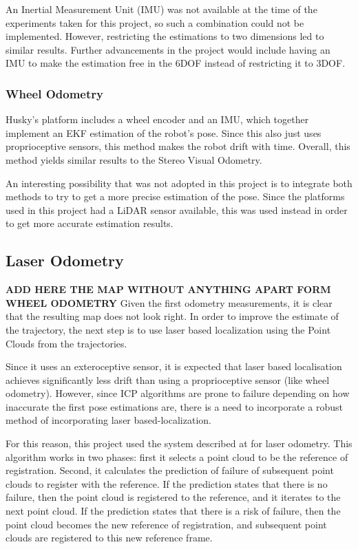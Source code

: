 \documentclass[12pt]{article}
\begin{document}
An Inertial Measurement Unit (IMU) was not available at the time of the experiments taken for this project, so such a combination could not be implemented. However, restricting the estimations to two dimensions led to similar results. Further advancements in the project would include having an IMU to make the estimation free in the 6DOF instead of restricting it to 3DOF.
	
	\subsubsection*{Wheel Odometry}

Husky's platform includes a wheel encoder and an IMU, which together implement an EKF estimation of the robot's pose. Since this also just uses proprioceptive sensors, this method makes the robot drift with time. Overall, this method yields similar results to the Stereo Visual Odometry.

An interesting possibility that was not adopted in this project is to integrate both methods to try to get a more precise estimation of the pose. Since the platforms used in this project had a LiDAR sensor available, this was used instead in order to get more accurate estimation results.

	\subsection{Laser Odometry}
	\label{subs:LaserOd}
\textbf{ADD HERE THE MAP WITHOUT ANYTHING APART FORM WHEEL ODOMETRY}
Given the first odometry measurements, it is clear that the resulting map does not look right. In order to improve the estimate of the trajectory, the next step is to use laser based localization using the Point Clouds from the trajectories.
	
Since it uses an exteroceptive sensor, it is expected that laser based localisation achieves significantly less drift than using a proprioceptive sensor (like wheel odometry). However, since ICP algorithms are prone to failure depending on how inaccurate the first pose estimations are, there is a need to incorporate a robust method of incorporating laser based-localization.
	
For this reason, this project used the system described at \cite{AICPAlign} for laser odometry. This algorithm works in two phases: first it selects a point cloud to be the reference of registration. Second, it calculates the prediction of failure of subsequent point clouds to register with the reference. If the prediction states that there is no failure, then the point cloud is registered to the reference, and it iterates to the next point cloud. If the prediction states that there is a risk of failure, then the point cloud becomes the new reference of registration, and subsequent point clouds are registered to this new reference frame.
	
\end{document}
